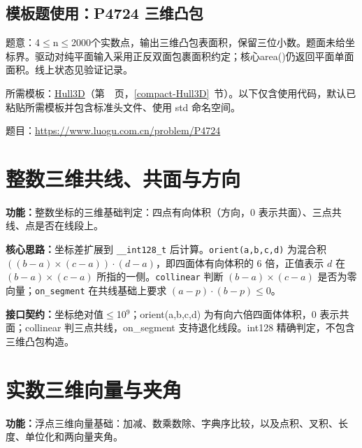 \subsection*{模板题使用：P4724 三维凸包}

\label{usage-example-400}

题意：4$\le$n$\le$2000个实数点，输出三维凸包表面积，保留三位小数。题面未给坐标界。驱动对纯平面输入采用正反双面包裹面积约定；核心area()仍返回平面单面面积。线上状态见验证记录。

所需模板：\hyperref[compact-Hull3D]{Hull3D}（第~\pageref{compact-Hull3D}~页，\ref{compact-Hull3D}~节）。以下仅含使用代码，默认已粘贴所需模板并包含标准头文件、使用 std 命名空间。

题目：\url{https://www.luogu.com.cn/problem/P4724}



\newpage

\Needspace{628pt}

\section{整数三维共线、共面与方向}\label{compact-IntegerGeometry3D}

\noindent\textbf{功能：}\allowbreak 整数坐标的三维基础判定：四点有向体积（方向，0 表示共面）、三点共线、点是否在线段上。

\textbf{核心思路：}\allowbreak 坐标差扩展到 \texttt{\_\_int128\_t} 后计算。\texttt{orient(a,b,c,d)} 为混合积 $((b-a)\times(c-a))\cdot(d-a)$，即四面体有向体积的 6 倍，正值表示 $d$ 在 $(b-a)\times(c-a)$ 所指的一侧。\texttt{collinear} 判断 $(b-a)\times(c-a)$ 是否为零向量；\texttt{on\_segment} 在共线基础上要求 $(a-p)\cdot(b-p)\le0$。



{\sloppy{}\noindent\textbf{接口契约：}坐标绝对值$\le$10$^{9}$；orient(a,b,c,d) 为有向六倍四面体体积，0 表示共面；collinear 判三点共线，on\_segment 支持退化线段。int128 精确判定，不包含三维凸包构造。\par}



\section{实数三维向量与夹角}\label{compact-RealSpace}

\noindent\textbf{功能：}\allowbreak 浮点三维向量基础：加减、数乘数除、字典序比较，以及点积、叉积、长度、单位化和两向量夹角。

